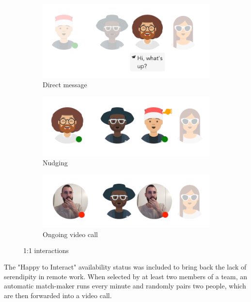 \begin{figure}[h]
    \centering
    \begin{subfigure}{.3\textwidth}
        \centering
        \includegraphics[width=.9\linewidth]{./images/DM.png}
        \caption{Direct message }
        \label{fig:dm}
    \end{subfigure}%
    \begin{subfigure}{.3\textwidth}
        \centering
        \includegraphics[width=.9\linewidth]{./images/nudging.png}
        \caption{Nudging }
        \label{fig:nudging}
    \end{subfigure}
    \begin{subfigure}{.3\textwidth}
        \centering
        \includegraphics[width=.9\linewidth]{./images/call.png}
        \caption{Ongoing video call }
        \label{fig:call}
    \end{subfigure}
    \caption{1:1 interactions}
    \label{fig:interaction_results}
\end{figure}

The "Happy to Interact" availability status was included to bring back the lack of serendipity in remote work. When selected by at least two members of a team, an automatic match-maker runs every minute and randomly pairs two people, which are then forwarded into a video call.
